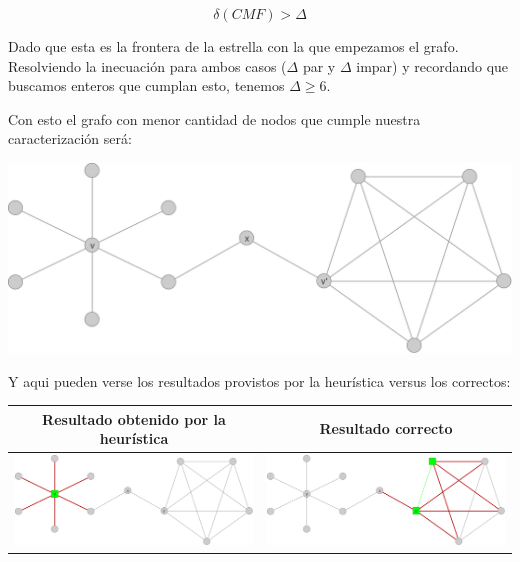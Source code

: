 \[ \delta(CMF) > \Delta \]

Dado que esta es la frontera de la estrella con la que empezamos el grafo. Resolviendo la 
inecuaci\'on para ambos casos ($\Delta$ par y $\Delta$ impar) y recordando que buscamos
enteros que cumplan esto, tenemos $\Delta \geq 6$.


Con esto el grafo con menor cantidad de nodos que cumple nuestra caracterizaci\'on ser\'a:
\begin{center} 
	\includegraphics[scale = 0.4]{img/ej3/constructiva_golosa/vnotincmf_carac1_min_st0.png} 
\end{center}

Y aqui pueden verse los resultados provistos por la heur\'istica versus los correctos:

\phantom{x}

\begin{tabular}{|c||c|}
	\hline
	Resultado obtenido por la heur\'istica & Resultado correcto \\
	\hline
	\includegraphics[scale = 0.18]{img/ej3/constructiva_golosa/vnotincmf_carac1_min_st01.png} &
	\includegraphics[scale = 0.18]{img/ej3/constructiva_golosa/vnotincmf_carac1_min_st11.png} \\
	\hline
\end{tabular}

